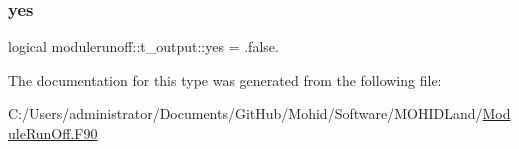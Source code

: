 \mbox{\label{structmodulerunoff_1_1t__output_ad3aa3ea59a6f4ed7b4a8428986b1c946}} 
\subsubsection{\texorpdfstring{yes}{yes}}
{\footnotesize\ttfamily logical modulerunoff\+::t\+\_\+output\+::yes = .false.\hspace{0.3cm}{\ttfamily [private]}}



The documentation for this type was generated from the following file\+:\begin{DoxyCompactItemize}
\item 
C\+:/\+Users/administrator/\+Documents/\+Git\+Hub/\+Mohid/\+Software/\+M\+O\+H\+I\+D\+Land/\mbox{\hyperlink{_module_run_off_8_f90}{Module\+Run\+Off.\+F90}}\end{DoxyCompactItemize}
